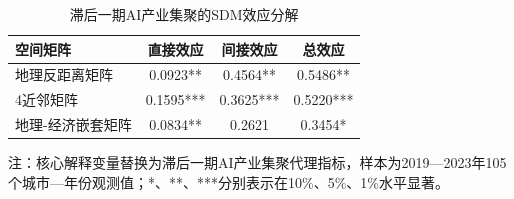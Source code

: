 \begin{table}[htbp]
\centering
\begin{threeparttable}
\caption{滞后一期AI产业集聚的SDM效应分解}
\label{tab:lagged-ai-sdm}
{\tablebodyformat
\begin{tabular}{lccc}
\toprule
空间矩阵 & 直接效应 & 间接效应 & 总效应 \\
\midrule
地理反距离矩阵 & 0.0923** & 0.4564** & 0.5486** \\
4近邻矩阵 & 0.1595*** & 0.3625*** & 0.5220*** \\
地理-经济嵌套矩阵 & 0.0834** & 0.2621 & 0.3454* \\
\bottomrule
\end{tabular}
}
\begin{tablenotes}
\footnotesize
\item 注：核心解释变量替换为滞后一期AI产业集聚代理指标，样本为2019—2023年105个城市—年份观测值；*、**、***分别表示在10\%、5\%、1\%水平显著。
\end{tablenotes}
\end{threeparttable}
\end{table}
